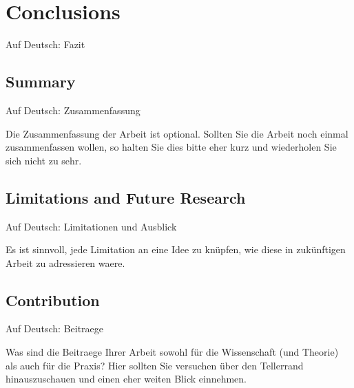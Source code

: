 \chapter{Conclusions}\label{chap:conclusions}

Auf Deutsch: Fazit

\section{Summary}

Auf Deutsch: Zusammenfassung 

Die Zusammenfassung der Arbeit ist optional. Sollten Sie die Arbeit noch einmal zusammenfassen wollen, so halten Sie dies bitte eher kurz und wiederholen Sie sich nicht zu sehr.

\section{Limitations and Future Research}

Auf Deutsch: Limitationen und Ausblick

Es ist sinnvoll, jede Limitation an eine Idee zu knüpfen, wie diese in zukünftigen Arbeit zu adressieren waere.

\section{Contribution}

Auf Deutsch: Beitraege

Was sind die Beitraege Ihrer Arbeit sowohl für die Wissenschaft (und Theorie) als auch für die Praxis? Hier sollten Sie versuchen über den Tellerrand hinauszuschauen und einen eher weiten Blick einnehmen.




